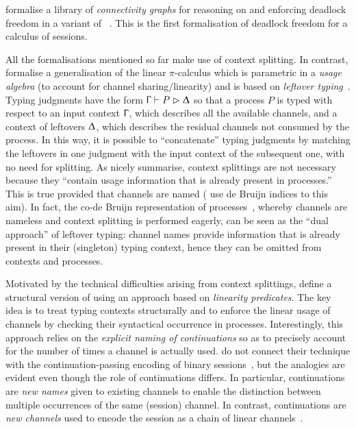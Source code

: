 \citet{JacobsBalzerKrebbers22} formalise a library of \emph{connectivity graphs}
for reasoning on and enforcing deadlock freedom in a variant of
\GV~\citep{GayVasconcelos10,Wadler14}. This is the first formalisation of
deadlock freedom for a calculus of sessions.

All the formalisations mentioned so far make use of context splitting. In
contrast, \citet{ZalakainDardha21} formalise a generalisation of the linear
$\pi$-calculus which is parametric in a \emph{usage algebra} (to account for
channel sharing/linearity) and is based on \emph{leftover
typing}~\cite{Allais17}. 
%
Typing judgments have the form $\Upgamma \vdash P \vartriangleright \Updelta$ so that a process $P$
is typed with respect to an input context $\Upgamma$, which describes all the
available channels, and a context of leftovers $\Updelta$, which describes the
residual channels not consumed by the process. In this way, it is possible to
``concatenate'' typing judgments by matching the leftovers in one judgment with
the input context of the subsequent one, with no need for splitting. As
\citet{ZalakainDardha21} nicely summarise, context splittings are not necessary
because they ``contain usage information that is already present in processes.''
This is true provided that channels are named (\citet{ZalakainDardha21} use de
Bruijn indices to this aim). In fact, the co-de Bruijn representation of
processes~\cite{McBride18}, whereby channels are nameless and context splitting
is performed eagerly, can be seen as the ``dual approach'' of leftover typing:
channel names provide information that is already present in their (singleton)
typing context, hence they can be omitted from contexts and processes.

Motivated by the technical difficulties arising from context splittings,
\citet{SanoKavanaghPientka23} define a structural version of \CP using an
approach based on \emph{linearity predicates}. The key idea is to treat typing
contexts structurally and to enforce the linear usage of channels by checking
their syntactical occurrence in processes. Interestingly, this approach relies
on the \emph{explicit naming of continuations} so as to precisely account for
the number of times a channel is actually used. \citet{SanoKavanaghPientka23} do
not connect their technique with the continuation-passing encoding of binary
sessions~\cite{Kobayashi02b,DardhaGiachinoSangiorgi17}, but the analogies are
evident even though the role of continuations differs. In particular,
\SCP continuations are \emph{new names} given to existing channels to enable the
distinction between multiple occurrences of the same (session) channel.
%
In contrast, \LCC continuations are \emph{new channels} used to encode the
session as a chain of linear
channels~\cite{Kobayashi02b,DardhaGiachinoSangiorgi17}.

